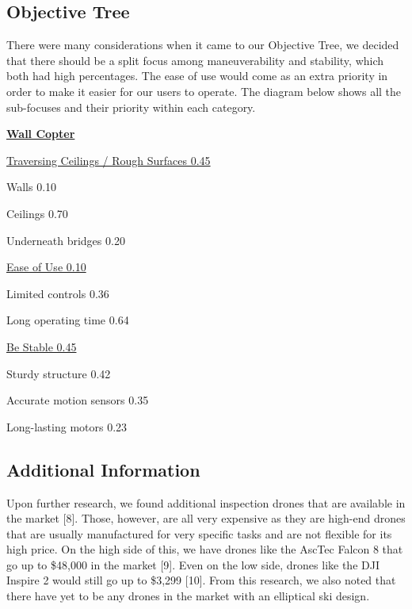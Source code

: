 \documentclass[12pt]{article}
\begin{document}
        \subsection{Objective Tree}
            There were many considerations when it came to our Objective Tree, we decided that there should be a split focus among maneuverability and stability, which both had high percentages.
            The ease of use would come as an extra priority in order to make it easier for our users to operate.
            The diagram below shows all the sub-focuses and their priority within each category.
            \centerline{\Large \underline{\textbf{Wall Copter}}}
            \begin{multicols}{3}
                \noindent\underline{Traversing Ceilings / Rough Surfaces 0.45}
                
                \noindent Walls 0.10
                
                \noindent Ceilings 0.70
                
                \noindent Underneath bridges 0.20

                \columnbreak

                \noindent\underline{Ease of Use 0.10}

                \noindent Limited controls 0.36

                \noindent Long operating time 0.64

                \columnbreak
                
                \noindent\underline{Be Stable 0.45}
                
                \noindent Sturdy structure 0.42
                
                \noindent Accurate motion sensors 0.35
                
                \noindent Long-lasting motors 0.23

            \end{multicols}
        
        \subsection{Additional Information}
            Upon further research, we found additional inspection drones that are available in the market [8].
            Those, however, are all very expensive as they are high-end drones that are usually manufactured for very specific tasks and are not flexible for its high price.
            On the high side of this, we have drones like the AscTec Falcon 8 that go up to \$48,000 in the market [9].
            Even on the low side, drones like the DJI Inspire 2 would still go up to \$3,299 [10].
            From this research, we also noted that there have yet to be any drones in the market with an elliptical ski design.
    
\end{document}
